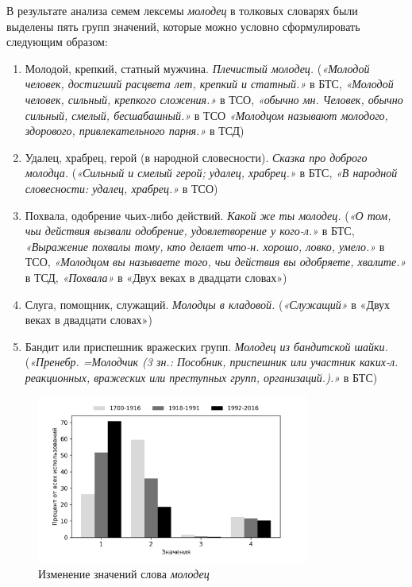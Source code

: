 В результате анализа семем лексемы \textit{молодец} в толковых словарях были выделены пять групп значений,
которые можно условно сформулировать следующим образом:

\begin{enumerate}
    \item Молодой, крепкий, статный мужчина. \textit{Плечистый молодец.}
    (\textit{«Молодой человек, достигший расцвета лет, крепкий и статный.»} в БТС,
    \textit{«Молодой человек, сильный, крепкого сложения.»} в ТСО,  %
    \textit{«обычно мн. Человек, обычно сильный, смелый, бесшабашный.»} в ТСО
    \textit{«Молодцом называют молодого, здорового, привлекательного парня.»} в ТСД)

    \item Удалец, храбрец, герой (в народной словесности). \textit{Сказка про доброго молодца.}
    (\textit{«Сильный и смелый герой; удалец, храбрец.»} в БТС,
    \textit{«В народной словесности: удалец, храбрец.»} в ТСО)

    \item Похвала, одобрение чьих-либо действий. \textit{Какой же ты молодец.}
    (\textit{«О том, чьи действия вызвали одобрение, удовлетворение у кого-л.»} в БТС,
    \textit{«Выражение похвалы тому, кто делает что-н. хорошо, ловко, умело.»} в ТСО,
    \textit{«Молодцом вы называете того, чьи действия вы одобряете, хвалите.»} в ТСД,
    \textit{«Похвала»} в «Двух веках в двадцати словах»)

    \item Слуга, помощник, служащий. \textit{Молодцы в кладовой.}
(\textit{«Служащий»} в «Двух веках в двадцати словах»)

    \item Бандит или приспешник вражеских групп. \textit{Молодец из бандитской шайки.}
(\textit{«Пренебр. =Молодчик (3 зн.: Пособник, приспешник или участник каких-л. реакционных,
вражеских или преступных групп, организаций.).»} в БТС)
\end{enumerate}


\begin{figure}[H]
	\centering
	\includegraphics[width=0.8\textwidth]{img/visualizations/molodets_minimal}
	\caption{Изменение значений слова \textit{молодец}}
	\label{fig:Молодец}
\end{figure}

